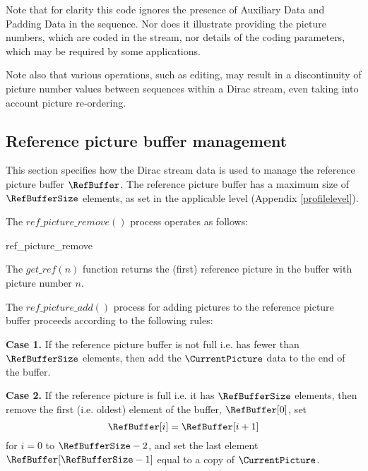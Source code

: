Note that for clarity this code ignores the presence of Auxiliary Data and Padding Data in the sequence. 
Nor does it illustrate providing the picture numbers, which are coded in the stream, nor details of the 
coding parameters, which may be required by some applications.

Note also that various operations, such as editing, may result in a discontinuity of picture number 
values between sequences within a Dirac stream, even taking into account picture re-ordering.

\subsection{Reference picture buffer management}
\label{refbuffer}

This section specifies how the Dirac stream data is used to manage the reference 
picture buffer $\RefBuffer$. The reference picture buffer has a maximum size of
$\RefBufferSize$ elements, as set in the applicable level (Appendix \ref{profilelevel}).

The $ref\_picture\_remove()$ process operates as
follows:

\begin{pseudo}{ref\_picture\_remove}{}
                \bsCODE{\RefBuffer[j]=\RefBuffer[j+1]}
            \bsEND
        \bsEND
    \bsEND
\bsEND
\bsCODE{\RetiredPictureList=\emptyset}
\end{pseudo}

The $get\_ref(n)$ function returns the (first) reference picture in the buffer with 
picture number $n$.  

The $ref\_picture\_add()$ process for adding pictures to the reference picture
buffer proceeds according to the following rules:

{\bf Case 1.} If the reference picture buffer is not full i.e. has fewer than $\RefBufferSize$ elements,
then add the $\CurrentPicture$ data to the end of the buffer. 

{\bf Case 2.} If the reference picture is full i.e. it has $\RefBufferSize$ elements, then remove the
first (i.e. oldest) element of the buffer, $\RefBuffer[0]$, set
\[\RefBuffer[i] = \RefBuffer[i+1] \]
for $i=0$ to $\RefBufferSize-2$, and set the last element $\RefBuffer[\RefBufferSize-1]$ equal to
a copy of $\CurrentPicture$.

